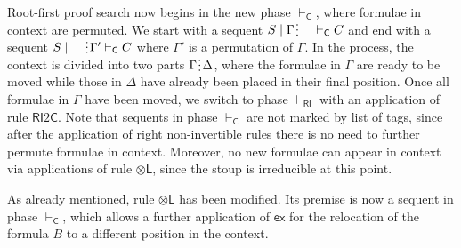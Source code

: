 \documentclass[submission,copyright,creativecommons]{eptcs}
\theoremstyle{definition}
\newcommand{\tl}{\otimes \mathsf{L}}
\newcommand{\C}{\mathsf{C}}
\newcommand{\RI}{\mathsf{RI}}
\newcommand{\ex}{\mathsf{ex}}
\newcommand{\spl}{\raisebox{-1.5pt}[0.5\height]{\hspace{1pt}\vdots\hspace{1pt}}}
\begin{document}
 Root-first proof search now begins in the new phase $\vdash_\C$, where formulae in context are permuted.
  We start with a sequent $S \mid \Gamma \spl \quad \vdash_{\C}C$ and end with a sequent $S \mid \quad \spl \Gamma' \vdash_{\C}C$ where $\Gamma'$ is a permutation of $\Gamma$.
  In the process, the context is divided into two parts $\Gamma \spl \Delta$, where the formulae in $\Gamma$ are ready to be moved while those in $\Delta$ have already been placed in their final position.
  Once all formulae in $\Gamma$ have been moved, we switch to phase $\vdash_\RI$ with an application of rule $\RI 2 \C$. 
  Note that sequents in phase $\vdash_\C$ are not marked by list of tags, since after the application of right non-invertible rules there is no need to further permute formulae in context. Moreover, no new formulae can appear in context via applications of rule $\tl$, since the stoup is irreducible at this point.

  As already mentioned, rule $\tl$ has been modified. Its premise is now a sequent in phase $\vdash_\C$, which allows a further application of $\ex$ for the relocation of the formula $B$ to a different position in the context.
\end{document}
